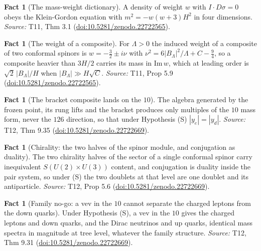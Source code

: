 \documentclass[11pt]{article}
\theoremstyle{definition}
\newtheorem{fact}[theorem]{Fact}
\theoremstyle{plain}
\begin{document}
\begin{fact}[The mass-weight dictionary]\label{c:mass.mass-weight-dictionary}
A density of weight $w$ with $I \cdot D\sigma = 0$ obeys the Klein-Gordon equation with $m^{2} = -w(w+3)H^{2}$ in four dimensions.
\emph{Source:} T11, Thm 3.1 (\href{https://doi.org/10.5281/zenodo.22722565}{doi:10.5281/zenodo.22722565}).
\end{fact}

\begin{fact}[The weight of a composite]\label{c:mass.weight-composite}
For $\Lambda > 0$ the induced weight of a composite of two conformal spinors is $w = -\tfrac32 \pm i\nu$ with $\nu^{2} = 6|B_{\Lambda}|^{2}/\Lambda + C - \tfrac94$, so a composite heavier than $3H/2$ carries its mass in $\mathrm{Im}\,w$, which at leading order is $\sqrt{2}\,|B_{\Lambda}|/H$ when $|B_{\Lambda}| \gg H\sqrt{C}$.
\emph{Source:} T11, Prop 5.9 (\href{https://doi.org/10.5281/zenodo.22722565}{doi:10.5281/zenodo.22722565}).
\end{fact}

\begin{fact}[The bracket composite lands on the $10$]\label{c:standard-model.bracket-composite-lands}
The algebra generated by the frozen point, its rung lifts and the bracket produces only multiples of the $10$ mass form, never the $126$ direction, so that under Hypothesis (S) $|y_{e}| = |y_{d}|$.
\emph{Source:} T12, Thm 9.35 (\href{https://doi.org/10.5281/zenodo.22722669}{doi:10.5281/zenodo.22722669}).
\end{fact}

\begin{fact}[Chirality: the two halves of the spinor module, and conjugation as duality]\label{c:standard-model.chirality-two-halves-spinor-module-conjugation}
The two chirality halves of the sector of a single conformal spinor carry inequivalent $S(U(2) \times U(3))$ content, and conjugation is duality inside the pair system, so under (S) the two doublets at that level are one doublet and its antiparticle.
\emph{Source:} T12, Prop 5.6 (\href{https://doi.org/10.5281/zenodo.22722669}{doi:10.5281/zenodo.22722669}).
\end{fact}

\begin{fact}[Family no-go: a vev in the $10$ cannot separate the charged leptons from the down quarks]\label{c:standard-model.family-no-go-vev-cannot-separate}
Under Hypothesis (S), a vev in the $10$ gives the charged leptons and down quarks, and the Dirac neutrinos and up quarks, identical mass spectra in magnitude at tree level, whatever the family structure.
\emph{Source:} T12, Thm 9.31 (\href{https://doi.org/10.5281/zenodo.22722669}{doi:10.5281/zenodo.22722669}).
\end{fact}
\end{document}
